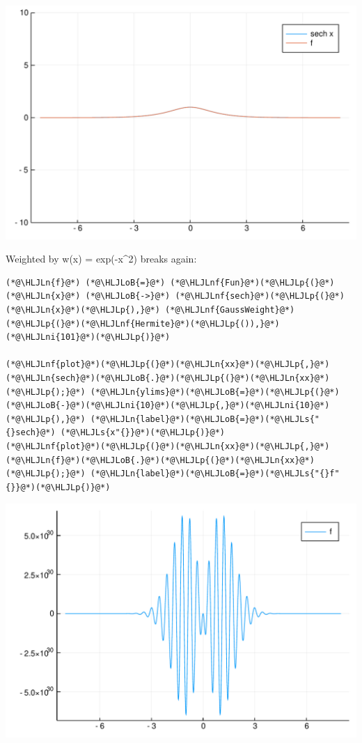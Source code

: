 \documentclass[12pt,a4paper]{article}
\newcommand{\HLJLn}[1]{#1}
\newcommand{\HLJLnf}[1]{\textcolor[RGB]{66,102,213}{#1}}
\newcommand{\HLJLs}[1]{\textcolor[RGB]{201,61,57}{#1}}
\newcommand{\HLJLni}[1]{\textcolor[RGB]{59,151,46}{#1}}
\newcommand{\HLJLoB}[1]{\textcolor[RGB]{102,102,102}{\textbf{#1}}}
\newcommand{\HLJLp}[1]{#1}
\begin{document}
\includegraphics[width=\linewidth]{figures/Lecture24_3_1.pdf}

Weighted by w(x) = exp(-x\^{}2) breaks again:


\begin{lstlisting}
(*@\HLJLn{f}@*) (*@\HLJLoB{=}@*) (*@\HLJLnf{Fun}@*)(*@\HLJLp{(}@*)(*@\HLJLn{x}@*) (*@\HLJLoB{->}@*) (*@\HLJLnf{sech}@*)(*@\HLJLp{(}@*)(*@\HLJLn{x}@*)(*@\HLJLp{),}@*) (*@\HLJLnf{GaussWeight}@*)(*@\HLJLp{(}@*)(*@\HLJLnf{Hermite}@*)(*@\HLJLp{()),}@*)(*@\HLJLni{101}@*)(*@\HLJLp{)}@*)

(*@\HLJLnf{plot}@*)(*@\HLJLp{(}@*)(*@\HLJLn{xx}@*)(*@\HLJLp{,}@*) (*@\HLJLn{sech}@*)(*@\HLJLoB{.}@*)(*@\HLJLp{(}@*)(*@\HLJLn{xx}@*)(*@\HLJLp{);}@*) (*@\HLJLn{ylims}@*)(*@\HLJLoB{=}@*)(*@\HLJLp{(}@*)(*@\HLJLoB{-}@*)(*@\HLJLni{10}@*)(*@\HLJLp{,}@*)(*@\HLJLni{10}@*)(*@\HLJLp{),}@*) (*@\HLJLn{label}@*)(*@\HLJLoB{=}@*)(*@\HLJLs{"{}sech}@*) (*@\HLJLs{x"{}}@*)(*@\HLJLp{)}@*)
(*@\HLJLnf{plot}@*)(*@\HLJLp{(}@*)(*@\HLJLn{xx}@*)(*@\HLJLp{,}@*) (*@\HLJLn{f}@*)(*@\HLJLoB{.}@*)(*@\HLJLp{(}@*)(*@\HLJLn{xx}@*)(*@\HLJLp{);}@*) (*@\HLJLn{label}@*)(*@\HLJLoB{=}@*)(*@\HLJLs{"{}f"{}}@*)(*@\HLJLp{)}@*)
\end{lstlisting}

\includegraphics[width=\linewidth]{figures/Lecture24_4_1.pdf}
\end{document}

